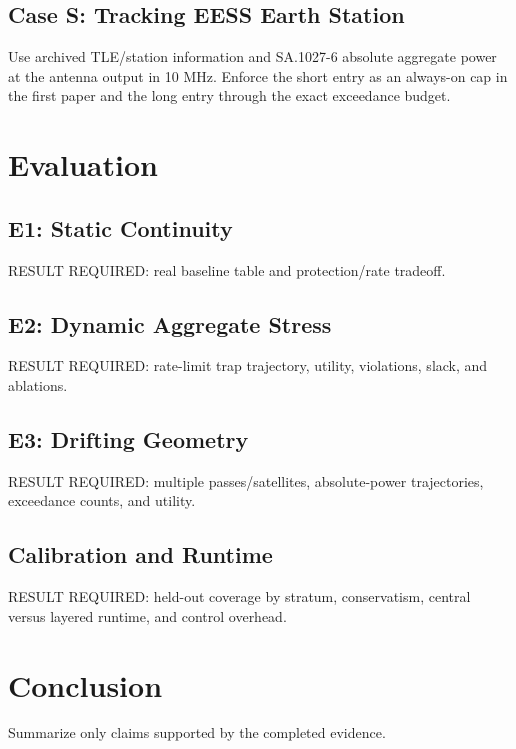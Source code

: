 \documentclass[journal]{IEEEtran}
\begin{document}
\subsection{Case S: Tracking EESS Earth Station}
Use archived TLE/station information and SA.1027-6 absolute aggregate power at the antenna output in 10 MHz. Enforce the short entry as an always-on cap in the first paper and the long entry through the exact exceedance budget.

\section{Evaluation}
\subsection{E1: Static Continuity}
RESULT REQUIRED: real baseline table and protection/rate tradeoff.
\subsection{E2: Dynamic Aggregate Stress}
RESULT REQUIRED: rate-limit trap trajectory, utility, violations, slack, and ablations.
\subsection{E3: Drifting Geometry}
RESULT REQUIRED: multiple passes/satellites, absolute-power trajectories, exceedance counts, and utility.
\subsection{Calibration and Runtime}
RESULT REQUIRED: held-out coverage by stratum, conservatism, central versus layered runtime, and control overhead.

\section{Conclusion}
Summarize only claims supported by the completed evidence.



\end{document}
